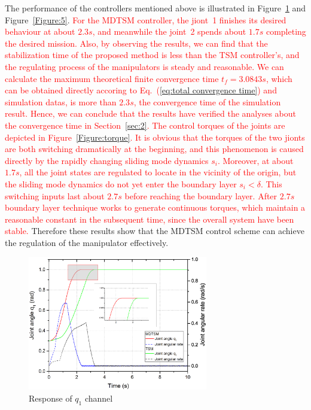 \documentclass[3p]{elsarticle}
\theoremstyle{plain}
\theoremstyle{remark}
\begin{document}
The performance of the controllers mentioned above is illustrated in Figure~\ref{Figure:4} and Figure~\ref{Figure:5}. \textcolor{red}{For the MDTSM controller, the jiont~1 finishes its desired behaviour at about $2.3s$, and meanwhile the joint~2 spends about $1.7s$ completing the desired mission. Also, by observing the results, we can find that the stabilization time of the proposed method is less than the TSM controller's, and the regulating process of the manipulators is steady and reasonable. We can calculate the maximum theoretical finite convergence time $t_f=3.0843s$, which can be obtained directly accoring to Eq.~(\ref{eq:total convergence time}) and simulation datas, is more than $2.3s$, the convergence time of the simulation result. Hence, we can conclude that the results have verified the analyses about the convergence time in Section~\ref{sec:2}.  The control torques of the joints are depicted in Figure~\ref{Figure:torque}. It is obvious that the torques of the two jionts are both switching dramatically at the beginning, and this phenomenon is caused directly by the rapidly changing sliding mode dynamics $s_i$. Moreover, at about $1.7s$, all the joint states are regulated to locate in the vicinity of the origin, but the sliding mode dynamics do not yet enter the boundary layer $s_i< \delta$. This switching inputs last about $2.7s$ before reaching the boundary layer. After $2.7s$ boundary layer technique works to generate continuous torques, which maintain a reasonable constant in the subsequent time, since the overall system have been stable.} Therefore these results show that the MDTSM control scheme can achieve the regulation of the manipulator effectively.
\begin{figure}
\centering
\includegraphics[width=0.7\textwidth]{paper3_fig4.eps}
\caption{Response of $q_1$ channel}
\label{Figure:4}
\end{figure}
\end{document}
